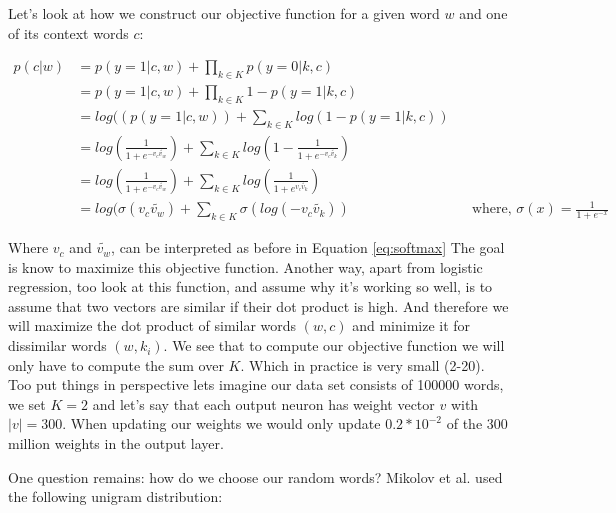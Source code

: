 Let's look at how we construct our objective function for a given word $w$ and one of its context words $c$: 

\begin{align*}
p(c|w) &= p(y=1|c,w) + \prod_{k\in K} p(y=0|k,c) 
\\&= p(y=1|c,w) + \prod_{k\in K} 1- p(y=1|k,c) 
\\&= log((p(y=1|c,w)) + \sum_{k\in K} log(1- p(y=1|k,c)) 
\\&=  log(\frac{1}{1+e^{-v_c \tilde{v_w }}})  + \sum_{k\in K} log(1-\frac{1}{1+e^{-v_c \tilde{v_k}}}) 
\\&=  log(\frac{1}{1+e^{-v_c \tilde{v_w } }})  + \sum_{k\in K} log(\frac{1}{1+e^{v_c \tilde{v_k} }})
\\&= log(\sigma(v_c \tilde{v_w } ) + \sum_{k\in K} \sigma(log(-v_c \tilde{v_k} )) &&\text{where, $\sigma(x) = \frac{1}{1+e^{-x}}$}
\end{align*}\label{eq:obj_neg_samples}

Where $v_c$ and $\tilde{v_w }$, can be interpreted as before in Equation \ref{eq:softmax} The goal is know to maximize this objective function. Another way, apart from logistic regression, too look at this function, and assume why it's working so well, is to assume that two vectors are similar if their dot product is high. And therefore we will maximize the dot product of similar words $(w,c)$ and minimize it for dissimilar words $(w,k_i)$.
We see that to compute our objective function we will only have to compute the sum over $K$. Which in practice is very small (2-20). Too put things in perspective lets imagine our data set consists of 100000 words, we set $K=2$ and let's say that each output neuron has weight vector $v$ with $|v| = 300$. When updating our weights we would only update  $0.2*10^{-2}$ of the 300 million weights in the output layer. 

One question remains: how do we choose our random words? Mikolov et al. \cite{mikolov2} used the following unigram distribution:
 
